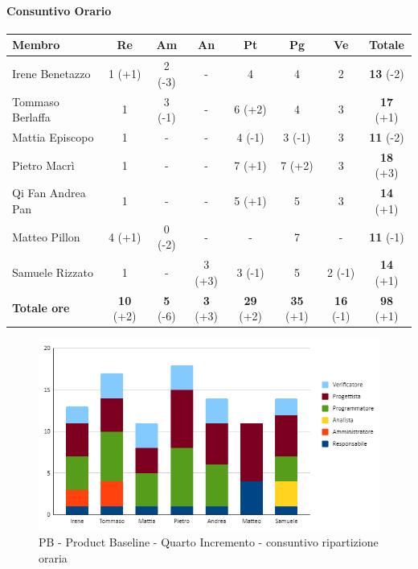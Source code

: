 \paragraph{Consuntivo Orario}
\begin{center}
	\renewcommand{\arraystretch}{1.8} %
	\begin{tabular}{ |m{8em}|c|c|c|c|c|c|c| }
	\hline
	\textbf{Membro} & \textbf{Re} & \textbf{Am} &  \textbf{An} &  \textbf{Pt} &  \textbf{Pg} &  \textbf{Ve} &  \textbf{Totale}\\
    \hline
    Irene Benetazzo   & 1 (+1) & 2 (-3)  & - & 4 & 4 & 2 & \textbf{13} (-2) \\
    \hline
    Tommaso Berlaffa  & 1 & 3 (-1)  & - & 6 (+2) & 4 & 3 & \textbf{17} (+1) \\
    \hline
    Mattia Episcopo   & 1 & - & - & 4 (-1) & 3 (-1) & 3 & \textbf{11} (-2) \\
    \hline
    Pietro Macrì      & 1 & - & - & 7 (+1) & 7 (+2) & 3 & \textbf{18} (+3) \\
    \hline
    Qi Fan Andrea Pan & 1 & - & - & 5 (+1) & 5 & 3 & \textbf{14} (+1)\\
    \hline
    Matteo Pillon     & 4 (+1) & 0 (-2)  & - & - & 7 & - & \textbf{11} (-1) \\
    \hline
    Samuele Rizzato   & 1 & - & 3 (+3) & 3 (-1) & 5 & 2 (-1) & \textbf{14} (+1) \\
    \hline
    \textbf{Totale ore} & \textbf{10} (+2) & \textbf{5} (-6) & \textbf{3} (+3) & \textbf{29} (+2) & \textbf{35} (+1) & \textbf{16} (-1) & \textbf{98} (+1)\\
    \hline
	\end{tabular}
\end{center}
\begin{figure}[H]
    \centering\includegraphics[width=\textwidth, height=\textheight,keepaspectratio]{images/consuntivo/PB-incremento4-orario.png}
    \caption{PB - Product Baseline - Quarto Incremento - consuntivo ripartizione oraria}
\end{figure}
\newpage

